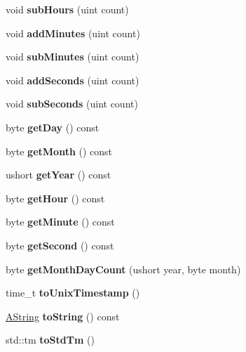 \begin{DoxyCompactItemize}
\item 
\mbox{\label{class_date_time_ad8731709f4f22cc39dd40b7facdbe058}} 
void {\bfseries sub\+Hours} (uint count)
\item 
\mbox{\label{class_date_time_a1da975e9de48724cc5c0b08dbfdb1b3c}} 
void {\bfseries add\+Minutes} (uint count)
\item 
\mbox{\label{class_date_time_a5046fae9b637fc3dc994fb5544133585}} 
void {\bfseries sub\+Minutes} (uint count)
\item 
\mbox{\label{class_date_time_a79bda8c555092ea62255498f86a07655}} 
void {\bfseries add\+Seconds} (uint count)
\item 
\mbox{\label{class_date_time_a985cb277733445af6b172ac9ec2630e9}} 
void {\bfseries sub\+Seconds} (uint count)
\item 
\mbox{\label{class_date_time_a3ffb237255a73bbe9f8000d18c870ea8}} 
byte {\bfseries get\+Day} () const
\item 
\mbox{\label{class_date_time_a18d5987a6def22fa88302cdb50941add}} 
byte {\bfseries get\+Month} () const
\item 
\mbox{\label{class_date_time_a5bab8648961a46a2a3cbca3868efecce}} 
ushort {\bfseries get\+Year} () const
\item 
\mbox{\label{class_date_time_ada00db60b48e636102d509a7b1b30296}} 
byte {\bfseries get\+Hour} () const
\item 
\mbox{\label{class_date_time_afcecea2d24e906df99b9105c116262b3}} 
byte {\bfseries get\+Minute} () const
\item 
\mbox{\label{class_date_time_a16d1e909db200146199b6623fce55a81}} 
byte {\bfseries get\+Second} () const
\item 
\mbox{\label{class_date_time_a88fcd4dec4b3d77e9abdbc2bb81ed18a}} 
byte {\bfseries get\+Month\+Day\+Count} (ushort year, byte month)
\item 
\mbox{\label{class_date_time_aae25042a72973b5192469bb84f08857a}} 
time\+\_\+t {\bfseries to\+Unix\+Timestamp} ()
\item 
\mbox{\label{class_date_time_a26824c34470bf04d3ee6343c4ec872d8}} 
\mbox{\hyperlink{class_a_string}{A\+String}} {\bfseries to\+String} () const
\item 
\mbox{\label{class_date_time_a69f433ebbc09ac4c201ca8c2ea6e5015}} 
std\+::tm {\bfseries to\+Std\+Tm} ()
\end{DoxyCompactItemize}
